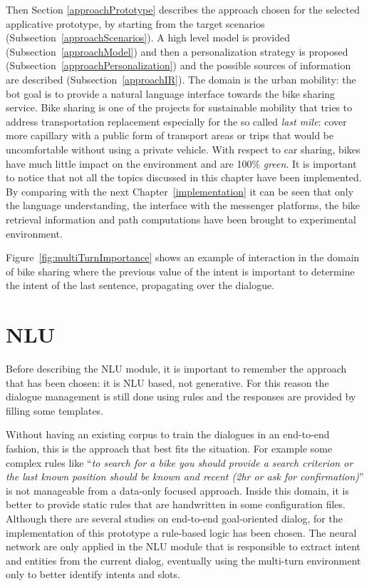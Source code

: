 Then Section \ref{approachPrototype} describes the approach chosen for the selected applicative prototype, by starting from the target scenarios (Subsection~\ref{approachScenarios}). A high level model is provided (Subsection~\ref{approachModel}) and then a personalization strategy is proposed (Subsection~\ref{approachPersonalization}) and the possible sources of information are described (Subsection~\ref{approachIR}). The domain is the urban mobility: the bot goal is to provide a natural language interface towards the bike sharing service. Bike sharing is one of the projects for sustainable mobility that tries to address transportation replacement especially for the so called \textit{last mile}: cover more capillary with a public form of transport areas or trips that would be uncomfortable without using a private vehicle. With respect to car sharing, bikes have much little impact on the environment and are 100\% \textit{green}. It is important to notice that not all the topics discussed in this chapter have been implemented. By comparing with the next Chapter~\ref{implementation} it can be seen that only the language understanding, the interface with the messenger platforms, the bike retrieval information and path computations have been brought to experimental environment.

Figure~\ref{fig:multiTurnImportance} shows an example of interaction in the domain of bike sharing where the previous value of the intent is important to determine the intent of the last sentence, propagating over the dialogue.

\section{NLU}
\label{approachNLU}

Before describing the NLU module, it is important to remember the approach that has been chosen: it is NLU based, not generative. For this reason the dialogue management is still done using rules and the responses are provided by filling some templates.

Without having an existing corpus to train the dialogues in an end-to-end fashion, this is the approach that best fits the situation. For example some complex rules like ``\textit{to search for a bike you should provide a search criterion or the last known position should be known and recent (2hr or ask for confirmation)}'' is not manageable from a data-only focused approach. Inside this domain, it is better to provide static rules that are handwritten in some configuration files. Although there are several studies on end-to-end goal-oriented dialog, for the implementation of this prototype a rule-based logic has been chosen. The neural network are only applied in the NLU module that is responsible to extract intent and entities from the current dialog, eventually using the multi-turn environment only to better identify intents and slots.

